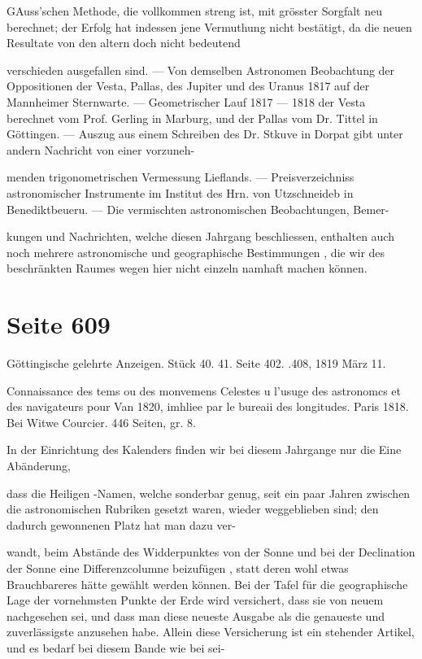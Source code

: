 \documentclass[10pt,a4paper]{article}
\begin{document}
GAuss'schen Methode, die vollkommen streng ist, mit grösster Sorgfalt neu berechnet; der Erfolg hat indessen jene Vermuthung nicht bestätigt, da die neuen Resultate von den altern doch nicht bedeutend

verschieden ausgefallen sind. — Von demselben Astronomen Beobachtung der Oppositionen der Vesta, Pallas, des Jupiter und des Uranus 1817 auf der Mannheimer Sternwarte. — Geometrischer Lauf 1817 — 1818 der Vesta berechnet vom Prof. Gerling in Marburg, und der Pallas vom Dr. Tittel in Göttingen. — Auszug aus einem Schreiben des Dr. Stkuve in Dorpat gibt unter andern Nachricht von einer vorzuneh-

menden trigonometrischen Vermessung Lieflands. — Preisverzeichniss astronomischer Instrumente im Institut des Hrn. von Utzschneideb in Benediktbeueru. — Die vermischten astronomischen Beobachtungen, Bemer-

kungen und Nachrichten, welche diesen Jahrgang beschliessen, enthalten auch noch mehrere astronomische und geographische Bestimmungen , die wir des beschränkten Raumes wegen hier nicht einzeln namhaft machen können.


\newpage
\section*{Seite 609}
Göttingische gelehrte Anzeigen. Stück 40. 41. Seite 402. .408, 1819 März 11.

Connaissance des tems ou des monvemens Celestes u l'usuge des astronomcs et des navigateurs pour Van 1820, imhliee par le bureaii des longitudes. Paris 1818. Bei Witwe Courcier. 446 Seiten, gr. 8.

In der Einrichtung des Kalenders finden wir bei diesem Jahrgange nur die Eine Abänderung,

dass die Heiligen -Namen, welche sonderbar genug, seit ein paar Jahren zwischen die astronomischen Rubriken gesetzt waren, wieder weggeblieben sind; den dadurch gewonnenen Platz hat man dazu ver-

wandt, beim Abstände des Widderpunktes von der Sonne und bei der Declination der Sonne eine Differenzcolumne beizufügen , statt deren wohl etwas Brauchbareres hätte gewählt werden können. Bei der Tafel für die geographische Lage der vornehmsten Punkte der Erde wird versichert, dass sie von neuem nachgesehen sei, und dass man diese neueste Ausgabe als die genaueste und zuverlässigste anzusehen habe. Allein diese Versicherung ist ein stehender Artikel, und es bedarf bei diesem Bande wie bei sei-
\end{document}

